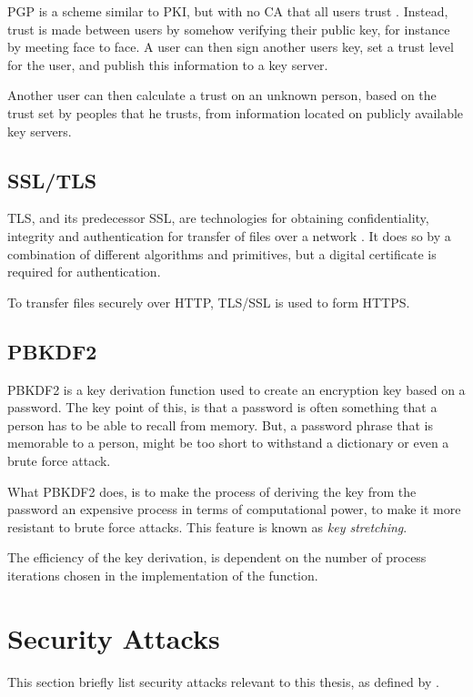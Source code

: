 \documentclass[pdftex,english,10pt,b5paper,twoside]{book}
\begin{document}
\ac{PGP} is a scheme similar to \ac{PKI}, but with no \ac{CA} that all users
trust \cite{stallings}. Instead, trust is made between users by somehow
verifying their public key, for instance by meeting face to face. A user can
then sign another users key, set a trust level for the user, and publish this
information to a key server.

Another user can then calculate a trust on an unknown person, based on the trust
set by peoples that he trusts, from information located on publicly
available key servers.

\subsection{SSL/TLS}

\ac{TLS}, and its predecessor \ac{SSL}, are technologies for obtaining
confidentiality, integrity and authentication for transfer of files over a
network \cite{stallings}. It does so by a combination of different algorithms
and primitives, but a digital certificate is required for authentication.

To transfer files securely over \ac{HTTP}, \ac{TLS}/\ac{SSL} is used to form
\ac{HTTPS}.

\subsection{PBKDF2}
\label{sec:PBKDF2}

\ac{PBKDF2} is a key derivation function used to create an encryption key based
on a password. The key point of this, is that a password is often something
that a person has to be able to recall from memory. But, a password phrase that
is memorable to a person, might be too short to withstand a dictionary or even
a brute force attack.

What \ac{PBKDF2} does, is to make the process of deriving the key from the password
an expensive process in terms of computational power, to make it more resistant
to brute force attacks. This feature is known as \emph{key stretching}.

The efficiency of the key derivation, is dependent on the number of process
iterations chosen in the implementation of the function.

\section{Security Attacks}

This section briefly list security attacks relevant to this thesis, as defined
by \citet[Ch. 1.3]{stallings}.
\end{document}
